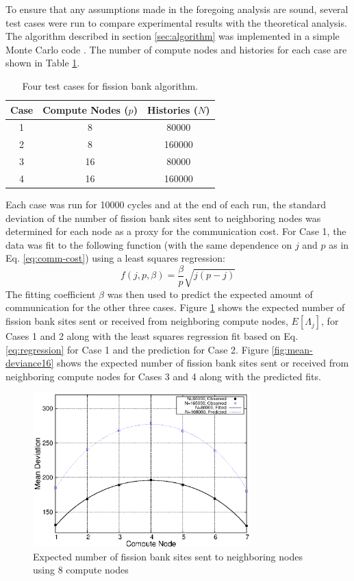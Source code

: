 To ensure that any assumptions made in the foregoing analysis are
sound, several test cases were run to compare experimental results
with the theoretical analysis. The algorithm described in section
\ref{sec:algorithm} was implemented in a simple Monte Carlo code
\cite{romano-LANL}. The number of compute nodes and histories for each
case are shown in Table \ref{tab:cases}.
\begin{table}[ht]
  \centering
  \caption{Four test cases for fission bank algorithm.}
  \label{tab:cases}
  \begin{tabular}{|c|c|c|}
    \hline
    Case & Compute Nodes ($p$) & Histories ($N$) \\
    \hline
    1 & 8 & 80000 \\
    2 & 8 & 160000 \\
    3 & 16 & 80000 \\
    4 & 16 & 160000 \\
    \hline
  \end{tabular}
\end{table}
Each case was run for 10000 cycles and at the end of each run, the
standard deviation of the number of fission bank sites sent to
neighboring nodes was determined for each node as a proxy for the
communication cost. For Case 1, the data was fit to the following
function (with the same dependence on $j$ and $p$ as in
Eq. \ref{eq:comm-cost}) using a least squares regression:
\begin{equation}\label{eq:regression}
  f(j,p,\beta) = \frac{\beta}{p} \sqrt{j(p-j)}
\end{equation}
The fitting coefficient $\beta$ was then used to predict the expected
amount of communication for the other three cases. Figure
\ref{fig:mean-deviance8} shows the expected number of fission bank
sites sent or received from neighboring compute nodes, $E \left [
  \Lambda_j \right ]$, for Cases 1 and 2 along with the least squares
regression fit based on Eq. \ref{eq:regression} for Case 1 and the
prediction for Case 2. Figure \ref{fig:mean-deviance16} shows the
expected number of fission bank sites sent or received from
neighboring compute nodes for Cases 3 and 4 along with the predicted
fits.
\begin{figure}[ht]
  \centering
  \includegraphics[width=0.75\textwidth]{figures/mean_deviance/plot8.eps}
  \caption{Expected number of fission bank sites sent to neighboring
    nodes using 8 compute nodes}
  \label{fig:mean-deviance8}
\end{figure}
